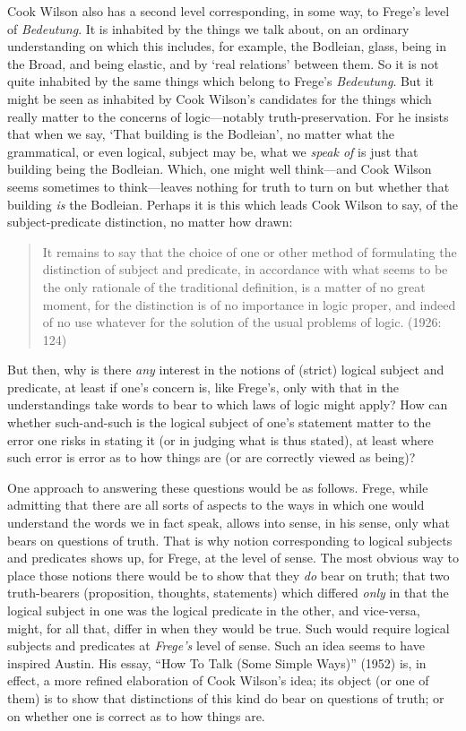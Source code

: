Cook Wilson also has a second level corresponding, in some way, to Frege’s level of \emph{Bedeutung}. It is inhabited by the things we talk about, on an ordinary understanding on which this includes, for example, the Bodleian, glass, being in the Broad, and being elastic, and by `real relations' between them. So it is not quite inhabited by the same things which belong to Frege’s \emph{Bedeutung}. But it might be seen as inhabited by Cook Wilson’s candidates for the things which really matter to the concerns of logic---notably truth-preservation. For he insists that when we say, `That building is the Bodleian', no matter what the grammatical, or even logical, subject may be, what we \emph{speak of} is just that building being the Bodleian. Which, one might well think---and Cook Wilson seems sometimes to think---leaves nothing for truth to turn on but whether that building \emph{is} the Bodleian. Perhaps it is this which leads Cook Wilson to say, of the subject-predicate distinction, no matter how drawn:
\begin{quote}
	It remains to say that the choice of one or other method of formulating the distinction of subject and predicate, in accordance with what seems to be the only rationale of the traditional definition, is a matter of no great moment, for the distinction is of no importance in logic proper, and indeed of no use whatever for the solution of the usual problems of logic. (1926: 124)
\end{quote}
But then, why is there \emph{any} interest in the notions of (strict) logical subject and predicate, at least if one’s concern is, like Frege’s, only with that in the understandings take words to bear to which laws of logic might apply? How can whether such-and-such is the logical subject of one’s statement matter to the error one risks in stating it (or in judging what is thus stated), at least where such error is error as to how things are (or are correctly viewed as being)?

One approach to answering these questions would be as follows. Frege, while admitting that there are all sorts of aspects to the ways in which one would understand the words we in fact speak, allows into sense, in his sense, only what bears on questions of truth. That is why notion corresponding to logical subjects and predicates shows up, for Frege, at the level of sense. The most obvious way to place those notions there would be to show that they \emph{do} bear on truth; that two truth-bearers (proposition, thoughts, statements) which differed \emph{only} in that the logical subject in one was the logical predicate in the other, and vice-versa, might, for all that, differ in when they would be true. Such would require logical subjects and predicates at \emph{Frege’s} level of sense. Such an idea seems to have inspired Austin. His essay, “How To Talk (Some Simple Ways)” (1952) is, in effect, a more refined elaboration of Cook Wilson’s idea; its object (or one of them) is to show that distinctions of this kind do bear on questions of truth; or on whether one is correct as to how things are.

